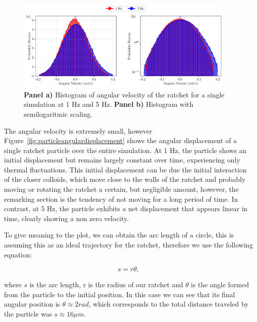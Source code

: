 \begin{figure}[h!]
  \begin{center}
    \includegraphics[width=0.95\textwidth]{figures/histogram_comparison.pdf}
  \end{center}
  \caption[Histogram of angular velocity.]{\textbf{Panel a)} Histogram of angular velocity of the ratchet for a single simulation at 1 Hz and 5 Hz. \textbf{Panel b)} Histogram with semilogaritmic scaling.}\label{fig:histogram}
\end{figure}

The angular velocity is extremely small, however Figure~\ref{fig:particleangulardisplacement} shows the angular displacement of a single ratchet particle over the entire simulation. At 1 Hz, the particle shows an initial displacement but remains largely constant over time, experiencing only thermal fluctuations. This initial displacement can be due the initial interaction of the closer colloids, which move close to the walls of the ratchet and probably moving or rotating the ratchet a certain, but negligible amount, however, the remarking section is the tendency of not moving for a long period of time. In contrast, at 5 Hz, the particle exhibits a net displacement that appears linear in time, clearly showing a non zero velocity.

To give meaning to the plot, we can obtain the arc length of a circle, this is assuming this as an ideal trajectory for the ratchet, therefore we use the following equation:

\begin{equation}
  s = r\theta,
  \label{eq:arclength}
\end{equation}

where $s$ is the arc length, r is the radius of our ratchet and $\theta$ is the angle formed from the particle to the initial position.
In this case we can see that its final angular position is $\theta \approx 2 rad$, which corresponds to the total distance traveled by the particle was $s \approx 16 \mu m$.


